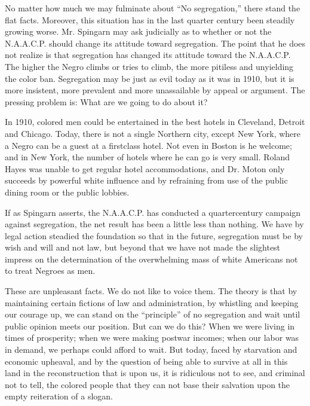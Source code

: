 \documentclass[letterpaper,10pt,english]{jupyterBook}
\begin{document}
\sphinxAtStartPar
No matter how much we may fulminate about “No segregation,” there stand the flat facts. Moreover, this situation has in the last quarter century been steadily growing worse. Mr. Spingarn may ask judicially as to whether or not the N.A.A.C.P. should change its attitude toward segregation. The point that he does not realize is that segregation has changed its attitude toward the N.A.A.C.P. The higher the Negro climbs or tries to climb, the more pitiless and unyielding the color ban. Segregation may be just as evil today as it was in 1910, but it is more insistent, more prevalent and more unassailable by appeal or argument. The pressing problem is: What are we going to do about it?

\sphinxAtStartPar
In 1910, colored men could be entertained in the best hotels in Cleveland, Detroit and Chicago. Today, there is not a single Northern city, except New York, where a Negro can be a guest at a first\sphinxhyphen{}class hotel. Not even in Boston is he welcome; and in New York, the number of hotels where he can go is very small. Roland Hayes was unable to get regular hotel accommodations, and Dr. Moton only succeeds by powerful white influence and by refraining from use of the public dining room or the public lobbies.

\sphinxAtStartPar
If as Spingarn asserts, the N.A.A.C.P. has conducted a quarter\sphinxhyphen{}century campaign against segregation, the net result has been a little less than nothing. We have by legal action steadied the foundation so that in the future, segregation must be by wish and will and not law, but beyond that we have not made the slightest impress on the determination of the overwhelming mass of white Americans not to treat Negroes as men.

\sphinxAtStartPar
These are unpleasant facts. We do not like to voice them. The theory is that by maintaining certain fictions of law and administration, by whistling and keeping our courage up, we can stand on the “principle” of no segregation and wait until public opinion meets our position. But can we do this? When we were living in times of prosperity; when we were making post\sphinxhyphen{}war incomes; when our labor was in demand, we perhaps could afford to wait. But today, faced by starvation and economic upheaval, and by the question of being able to survive at all in this land in the reconstruction that is upon us, it is ridiculous not to see, and criminal not to tell, the colored people that they can not base their salvation upon the empty reiteration of a slogan.
\end{document}
